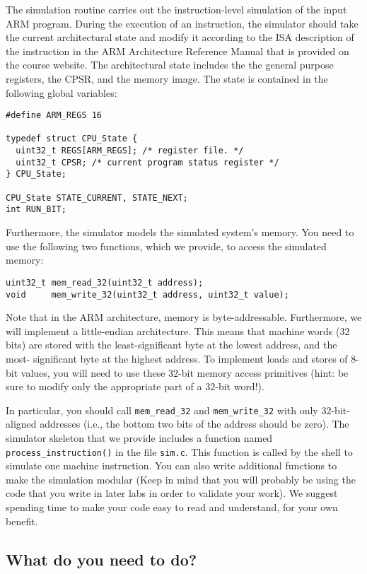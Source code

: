 \documentclass{article}
\begin{document}
The simulation routine carries out the instruction-level simulation of
the input ARM program. During the execution of an instruction, the
simulator should take the current architectural state and modify it
according to the ISA description of the instruction in the ARM
Architecture Reference Manual that is provided on the course
website. The architectural state includes the the general purpose
registers, the CPSR, and the memory image. The state is contained in the
following global variables:
\begin{verbatim}
#define ARM_REGS 16

typedef struct CPU_State {
  uint32_t REGS[ARM_REGS]; /* register file. */
  uint32_t CPSR; /* current program status register */
} CPU_State;

CPU_State STATE_CURRENT, STATE_NEXT;
int RUN_BIT;
\end{verbatim}
Furthermore, the simulator models the simulated system's memory. You
need to use the following two functions, which we provide, to access
the simulated memory:
\begin{verbatim}
uint32_t mem_read_32(uint32_t address);
void     mem_write_32(uint32_t address, uint32_t value);
\end{verbatim}
Note that in the ARM architecture, memory is
byte-addressable. Furthermore, we will
implement a little-endian architecture. This means that machine words
($32$ bits) are stored with the least-significant byte at the lowest
address, and the most- significant byte at the highest address. To
implement loads and stores of $8$-bit values, you will need
to use these $32$-bit memory access primitives (hint: be sure to modify
only the appropriate part of a $32$-bit word!).

In particular, you should call \verb+mem_read_32+ and
\verb+mem_write_32+ with only
$32$-bit-aligned addresses (i.e., the bottom two bits of the address
should be zero).
The simulator skeleton that we provide includes a function
named \verb+process_instruction()+ in the file \verb+sim.c+. This
function is called
by the shell to simulate one machine instruction. 
You can also write additional functions to make the
simulation modular (Keep in mind that you will probably be using the
code that you write in later labs in order to validate your work). 
We suggest
spending time to make your code easy to read and understand, for your
own benefit.

\subsection{What do you need to do?}
\label{instructions.sec}
\end{document}
